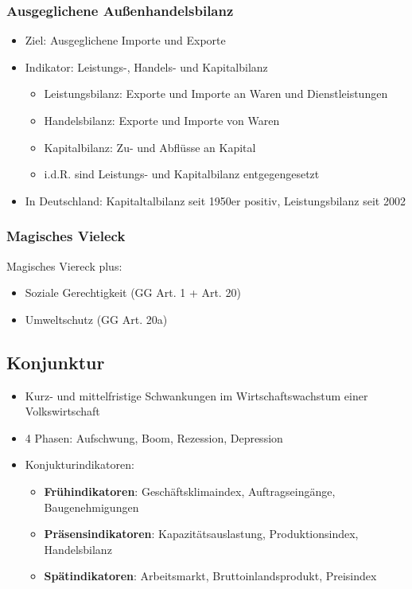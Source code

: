 \documentclass[titlepage,parskip=half]{scrartcl}
\begin{document}
\subsubsection{Ausgeglichene Außenhandelsbilanz}
\begin{itemize}
    \item Ziel: Ausgeglichene Importe und Exporte
    \item Indikator: Leistungs-, Handels- und Kapitalbilanz
    \begin{itemize}
        \item Leistungsbilanz: Exporte und Importe an Waren und Dienstleistungen 
        \item Handelsbilanz: Exporte und Importe von Waren
        \item Kapitalbilanz: Zu- und Abflüsse an Kapital
        \item i.d.R. sind Leistungs- und Kapitalbilanz entgegengesetzt
    \end{itemize}
    \item In Deutschland: Kapitaltalbilanz seit 1950er positiv, Leistungsbilanz seit 2002
\end{itemize}

\subsubsection{Magisches Vieleck}
Magisches Viereck plus:
\begin{itemize}
    \item Soziale Gerechtigkeit (GG Art. 1 + Art. 20)
    \item Umweltschutz (GG Art. 20a)
\end{itemize}

\subsection{Konjunktur}
\begin{itemize}
    \item Kurz- und mittelfristige Schwankungen im Wirtschaftswachstum einer Volkswirtschaft
    \item 4 Phasen: Aufschwung, Boom, Rezession, Depression
    \item Konjukturindikatoren:
    \begin{itemize}
        \item \textbf{Frühindikatoren}: Geschäftsklimaindex, Auftragseingänge, Baugenehmigungen
        \item \textbf{Präsensindikatoren}: Kapazitätsauslastung, Produktionsindex, Handelsbilanz
        \item \textbf{Spätindikatoren}: Arbeitsmarkt, Bruttoinlandsprodukt, Preisindex
    \end{itemize}
\end{itemize}
\end{document}
